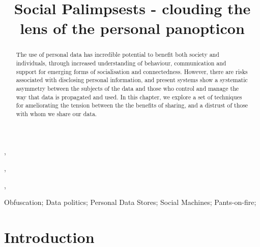 \documentclass{IOS-Book-Article}     %
\begin{document}
\begin{frontmatter}          %
%
\title{Social Palimpsests - clouding the lens of the personal panopticon}



\author[A]{ },
\author[B]{ },
\author[B]{ },
\author[B]{ }

\address[A]{Centre for Intelligent Systems and Applications,
Department of Informatics, University of Edinburgh}
\address[B]{Web and Internet Science Research Group, Electronics and Computer Science, University of Southampton}

\begin{abstract}
The use of personal data has incredible potential to benefit both society and
individuals, through increased understanding of behaviour, communication and
support for emerging forms of socialisation and connectedness. However, there
are risks associated with disclosing personal information, and present systems
show a systematic asymmetry between the subjects of the data and those who
control and manage the way that data is propagated and used. In this chapter, we
explore a set of techniques for ameliorating the tension between the 
the benefits of sharing, and a distrust of those with whom we share our data.
\end{abstract}

\begin{keyword}
Obfuscation; Data politics; Personal Data Stores; Social Machines; Pants-on-fire;
\end{keyword}

\end{frontmatter}


\section*{Introduction}

\end{document}
